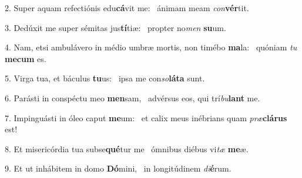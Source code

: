 2. Super aquam refectiónis edu\textbf{cá}vit me: \ast\  ánimam meam \textit{con}\textbf{vér}tit.\

3. Dedúxit me super sémitas jus\textbf{tí}tiæ: \ast\  propter no\textit{men} \textbf{su}um.\

4. Nam, etsi ambulávero in médio umbræ mortis, non timébo \textbf{ma}la: \ast\  quóniam \textit{tu} \textbf{me}\textbf{cum} es.\

5. Virga tua, et báculus \textbf{tu}us: \ast\  ipsa me con\textit{so}\textbf{lá}\textbf{ta} sunt.\

6. Parásti in conspéctu meo \textbf{men}sam, \ast\  advérsus eos, qui trí\textit{bu}\textbf{lant} me.\

7. Impinguásti in óleo caput \textbf{me}um: \ast\  et calix meus inébrians quam \textit{præ}\textbf{clá}\textbf{rus} est!\

8. Et misericórdia tua subse\textbf{qué}tur me \ast\  ómnibus diébus vi\textit{tæ} \textbf{me}æ.\

9. Et ut inhábitem in domo \textbf{Dó}mini, \ast\  in longitúdinem \textit{di}\textbf{é}rum.\

